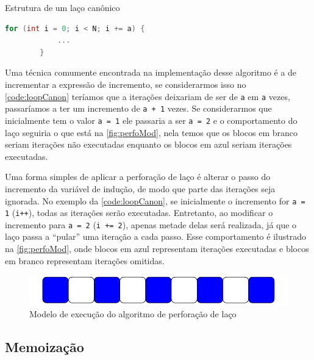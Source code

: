 \begin{sourcecode}[htb]\caption{\label{code:loopCanon}Estrutura de um laço canônico}
    \begin{lstlisting}[frame=single, language=C++]
        for (int i = 0; i < N; i += a) {
            ...
        }
    \end{lstlisting}
    \fonte{}
\end{sourcecode}

Uma técnica comumente encontrada na implementação desse algoritmo é a de incrementar a expressão de incremento, se considerarmos isso no \autoref{code:loopCanon} teríamos que a iterações deixariam de ser de \texttt{a} em \texttt{a} vezes, passaríamos a ter um incremento de \texttt{a + 1} vezes. Se considerarmos que inicialmente tem o valor \texttt{a = 1} ele passaria a ser \texttt{a = 2} e o comportamento do laço seguiria o que está na \autoref{fig:perfoMod}, nela temos que os blocos em branco seriam iterações não executadas enquanto os blocos em azul seriam iterações executadas.

Uma forma simples de aplicar a perforação de laço é alterar o passo do incremento da variável de indução, de modo que parte das iterações seja ignorada. No exemplo da \autoref{code:loopCanon}, se inicialmente o incremento for \texttt{a = 1} (\texttt{i++}), todas as iterações serão executadas. Entretanto, ao modificar o incremento para \texttt{a = 2} (\texttt{i += 2}), apenas metade delas será realizada, já que o laço passa a “pular” uma iteração a cada passo. Esse comportamento é ilustrado na \autoref{fig:perfoMod}, onde blocos em azul representam iterações executadas e blocos em branco representam iterações omitidas.

\begin{figure}[htb]
    \caption{Modelo de execução do algoritmo de perforação de laço}
    \label{fig:perfoMod}
    \includegraphics[scale=0.7]{Figuras/loop_perfo.pdf}
    \fonte{}
\end{figure}

\subsection{Memoização}\label{subsec:memo}

